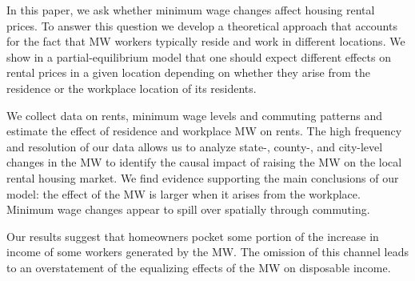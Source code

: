 
In this paper, we ask whether minimum wage changes affect housing rental prices.
To answer this question we develop a theoretical approach that accounts for
the fact that MW workers typically reside and work in different locations.
We show in a partial-equilibrium model that one should expect different effects
on rental prices in a given location depending on whether they arise from the 
residence or the workplace location of its residents.

We collect data on rents, minimum wage levels and commuting patterns and 
estimate the effect of residence and workplace MW on rents.
The high frequency and resolution of our data allows us to analyze state-, county-, 
and city-level changes in the MW to identify the causal impact of raising the MW 
on the local rental housing market.
We find evidence supporting the main conclusions of our model: the effect of the 
MW is larger when it arises from the workplace.
Minimum wage changes appear to spill over spatially through commuting.

Our results suggest that homeowners pocket some portion of the increase in 
income of some workers generated by the MW.
The omission of this channel leads to an overstatement of the equalizing effects 
of the MW on disposable income.
